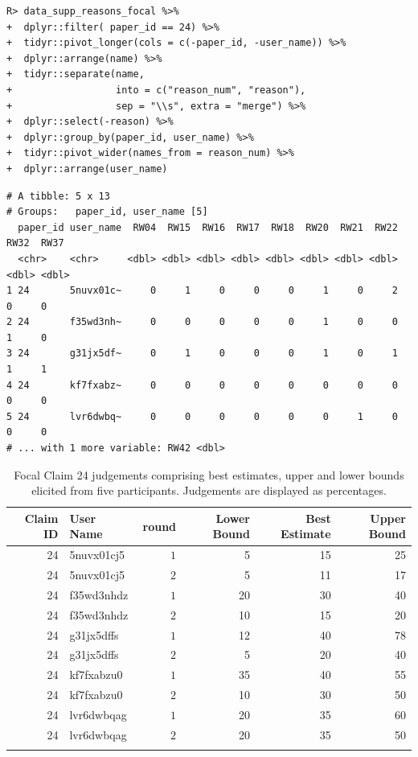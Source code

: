 \documentclass[article]{jss}
\begin{document}
\begin{verbatim}
R> data_supp_reasons_focal %>%
+  dplyr::filter( paper_id == 24) %>%
+  tidyr::pivot_longer(cols = c(-paper_id, -user_name)) %>%
+  dplyr::arrange(name) %>%
+  tidyr::separate(name, 
+                  into = c("reason_num", "reason"), 
+                  sep = "\\s", extra = "merge") %>%
+  dplyr::select(-reason) %>%
+  dplyr::group_by(paper_id, user_name) %>%
+  tidyr::pivot_wider(names_from = reason_num) %>%
+  dplyr::arrange(user_name)
\end{verbatim}

\begin{verbatim}
# A tibble: 5 x 13
# Groups:   paper_id, user_name [5]
  paper_id user_name  RW04  RW15  RW16  RW17  RW18  RW20  RW21  RW22  RW32  RW37
  <chr>    <chr>     <dbl> <dbl> <dbl> <dbl> <dbl> <dbl> <dbl> <dbl> <dbl> <dbl>
1 24       5nuvx01c~     0     1     0     0     0     1     0     2     0     0
2 24       f35wd3nh~     0     0     0     0     0     1     0     0     1     0
3 24       g31jx5df~     0     1     0     0     0     1     0     1     1     1
4 24       kf7fxabz~     0     0     0     0     0     0     0     0     0     0
5 24       lvr6dwbq~     0     0     0     0     0     0     1     0     0     0
# ... with 1 more variable: RW42 <dbl>
\end{verbatim}

\hypertarget{tbl-reason-wagg-focal-claim}{}
\begin{longtable}{rlrrrr}

\toprule
Claim ID & User Name & round & Lower Bound & Best Estimate & Upper Bound \\ 
\midrule
24 & 5nuvx01cj5 & $1$ & 5 & 15 & 25 \\ 
24 & 5nuvx01cj5 & $2$ & 5 & 11 & 17 \\ 
24 & f35wd3nhdz & $1$ & 20 & 30 & 40 \\ 
24 & f35wd3nhdz & $2$ & 10 & 15 & 20 \\ 
24 & g31jx5dffs & $1$ & 12 & 40 & 78 \\ 
24 & g31jx5dffs & $2$ & 5 & 20 & 40 \\ 
24 & kf7fxabzu0 & $1$ & 35 & 40 & 55 \\ 
24 & kf7fxabzu0 & $2$ & 10 & 30 & 50 \\ 
24 & lvr6dwbqag & $1$ & 20 & 35 & 60 \\ 
24 & lvr6dwbqag & $2$ & 20 & 35 & 50 \\ 
\bottomrule
\caption{\label{tbl-reason-wagg-focal-claim}Focal Claim 24 judgements comprising best estimates, upper and lower
bounds elicited from five participants. Judgements are displayed as
percentages. }\tabularnewline
\end{longtable}
\end{document}
